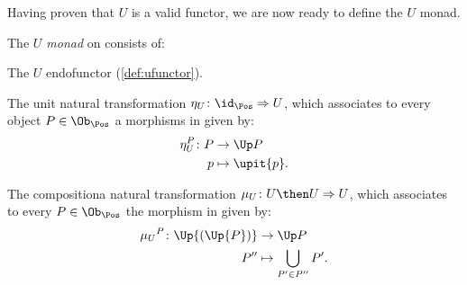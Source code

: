 Having proven that $U$ is a valid functor, we are now ready to define the $U$ monad.
\begin{definition}[$U$ monad]
  The \emph{$U$ monad} on \Pos consists of:
  \begin{compactenum}
    \item The $U$ endofunctor (\cref{def:ufunctor}).
    \item The unit natural transformation $\eta_U \colon \id_{\Pos}\Rightarrow U$, which associates to every object $P\in \Ob_\Pos$ a morphisms in \Pos given by:
    \begin{equation}
      \begin{aligned}
        \eta_{U}^P\colon P &\to \Up P\\
        p&\mapsto \upit \{p\}.
      \end{aligned}
    \end{equation}
    \item The compositiona natural transformation $\mu_U\colon U\then U\Rightarrow U$, which associates to every $P\in \Ob_\Pos$ the morphism in \Pos given by:
    \begin{equation}
      \begin{aligned}
        \mu{_U}^P\colon \Up{(\Up{P})}&\to \Up P\\
        P''&\mapsto \bigcup_{P'\in P''}P'.
      \end{aligned}
    \end{equation}
  \end{compactenum}
\end{definition}

